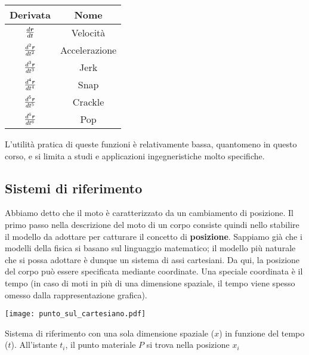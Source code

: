 \setlength{\tabcolsep}{10pt} %
\renewcommand{\arraystretch}{1.5} %
\begin{center}
    \begin{tabular}{c c}
        \hline
        Derivata & Nome\\
        \hline
        $\frac{d\textbf{\textit{r}}}{dt}$ & Velocità\\
        $\frac{d^2\textbf{\textit{r}}}{dt^2}$ & Accelerazione\\
        $\frac{d^3\textbf{\textit{r}}}{dt^3}$ & Jerk\\
        $\frac{d^4\textbf{\textit{r}}}{dt^4}$ & Snap\\
        $\frac{d^5\textbf{\textit{r}}}{dt^5}$ & Crackle\\
        $\frac{d^6\textbf{\textit{r}}}{dt^6}$ & Pop\\
    \end{tabular}
\end{center}

L'utilità pratica di queste funzioni è relativamente bassa, quantomeno
in questo corso, e si limita a studi e applicazioni ingegneristiche
molto specifiche.












\newpage
\subsection*{Sistemi di riferimento}
Abbiamo detto che il moto è caratterizzato da un cambiamento di posizione. Il primo
passo nella descrizione del moto di un corpo consiste quindi nello stabilire il
modello da adottare per catturare il concetto di \textbf{posizione}. Sappiamo già
che i modelli della fisica si basano sul linguaggio matematico; il modello più
naturale che si possa adottare è dunque un sistema di assi cartesiani. Da qui, la
posizione del corpo può essere specificata mediante coordinate. Una speciale
coordinata è il tempo (in caso di moti in più di una dimensione spaziale, il
tempo viene spesso omesso dalla rappresentazione grafica).

\begin{marginfigure}
    \centering
    \texttt{[image: punto\_sul\_cartesiano.pdf]}
    \caption{Sistema di riferimento con una sola dimensione spaziale ($x$)
    in funzione del tempo ($t$). All'istante $t_i$, il punto materiale $P$
    si trova nella posizione $x_i$}
    \label{point}
\end{marginfigure}

